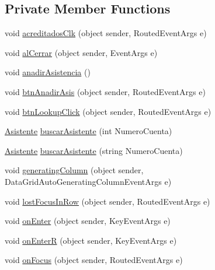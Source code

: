 \subsection*{Private Member Functions}
\begin{DoxyCompactItemize}
\item 
void \hyperlink{class_asistencias__wpf_1_1_main_window_a5ef0449f967aa4a8f873a0be96d81e16}{acreditados\-Clk} (object sender, Routed\-Event\-Args e)
\item 
void \hyperlink{class_asistencias__wpf_1_1_main_window_ab5f019117c860bd68f349a2d33313962}{al\-Cerrar} (object sender, Event\-Args e)
\item 
void \hyperlink{class_asistencias__wpf_1_1_main_window_a2b8b0e43fb4aebf353e6aa490115924e}{anadir\-Asistencia} ()
\item 
void \hyperlink{class_asistencias__wpf_1_1_main_window_ae82807e4848c98f05418df82f3da7159}{btn\-Anadir\-Asis} (object sender, Routed\-Event\-Args e)
\item 
void \hyperlink{class_asistencias__wpf_1_1_main_window_a0e869f220f887ff19bf34d09aee597c1}{btn\-Lookup\-Click} (object sender, Routed\-Event\-Args e)
\item 
\hyperlink{class_asistencias__wpf_1_1_asistente}{Asistente} \hyperlink{class_asistencias__wpf_1_1_main_window_af6dad6f9bfb02c1d33e0e3d73d142894}{buscar\-Asistente} (int Numero\-Cuenta)
\item 
\hyperlink{class_asistencias__wpf_1_1_asistente}{Asistente} \hyperlink{class_asistencias__wpf_1_1_main_window_a734f2fd5e3c402074d663248ebba510c}{buscar\-Asistente} (string Numero\-Cuenta)
\item 
void \hyperlink{class_asistencias__wpf_1_1_main_window_a2a8d8e5780af57c07558431272ee4988}{generating\-Column} (object sender, Data\-Grid\-Auto\-Generating\-Column\-Event\-Args e)
\item 
void \hyperlink{class_asistencias__wpf_1_1_main_window_ae1c324b160c3fabd96c9a98b3b1dfa5e}{lost\-Focus\-In\-Row} (object sender, Routed\-Event\-Args e)
\item 
void \hyperlink{class_asistencias__wpf_1_1_main_window_af5e3f09d78ecb240a880e737454e1246}{on\-Enter} (object sender, Key\-Event\-Args e)
\item 
void \hyperlink{class_asistencias__wpf_1_1_main_window_a021f286d29f89afb7e646c8a02fdcb4b}{on\-Enter\-R} (object sender, Key\-Event\-Args e)
\item 
void \hyperlink{class_asistencias__wpf_1_1_main_window_acb5ec5ec33907eb146447f12fcd18d94}{on\-Focus} (object sender, Routed\-Event\-Args e)

\end{DoxyCompactItemize}
